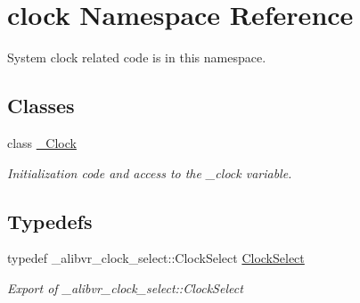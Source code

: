 \hypertarget{namespaceclock}{}\section{clock Namespace Reference}
\label{namespaceclock}


System clock related code is in this namespace.  


\subsection*{Classes}
\begin{DoxyCompactItemize}
\item 
class \hyperlink{classclock_1_1__Clock}{\+\_\+\+Clock}
\begin{DoxyCompactList}\small\item\em Initialization code and access to the \+\_\+clock variable. \end{DoxyCompactList}\end{DoxyCompactItemize}
\subsection*{Typedefs}
\begin{DoxyCompactItemize}
\item 
\hypertarget{namespaceclock_ac435d838e47eaebdb967aebfeab78eae}{}\label{namespaceclock_ac435d838e47eaebdb967aebfeab78eae} 
typedef \+\_\+alibvr\+\_\+clock\+\_\+select\+::\+Clock\+Select \hyperlink{namespaceclock_ac435d838e47eaebdb967aebfeab78eae}{Clock\+Select}
\begin{DoxyCompactList}\small\item\em Export of {\ttfamily \+\_\+alibvr\+\_\+clock\+\_\+select\+::\+Clock\+Select} \end{DoxyCompactList}\end{DoxyCompactItemize}
